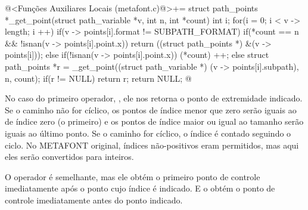 {{{{{{\iniciocodigo
@<Funções Auxiliares Locais (metafont.c)@>+=
struct path_points *_get_point(struct path_variable *v, int n, int *count){
  int i;
  for(i = 0; i < v -> length; i ++){
    if(v -> points[i].format != SUBPATH_FORMAT) {
      if(*count == n && !isnan(v -> points[i].point.x))
	return ((struct path_points *) &(v -> points[i]));
      else if(!isnan(v -> points[i].point.x))
	(*count) ++;
    }
    else{
      struct path_points *r =
	_get_point((struct path_variable *) (v -> points[i].subpath),
		   n, count);
      if(r != NULL)
	return r;
    }
  }
  return NULL;
}
@
\fimcodigo


No caso do primeiro operador, , ele nos retorna o
ponto de extremidade indicado. Se o caminho não for cíclico, os pontos
de índice menor que zero serão iguais ao de índice zero (o primeiro) e
os pontos de índice maior ou igual ao tamanho serão iguais ao último
ponto. Se o caminho for cíclico, o índice é contado seguindo o
ciclo. No METAFONT original, índices não-positivos eram permitidos,
mas aqui eles serão convertidos para inteiros.

O operador  é semelhante, mas ele obtém o
primeiro ponto de controle imediatamente após o ponto cujo índice é
indicado. E o  obtém o ponto de controle
imediatamente antes do ponto indicado.

}}}}}}
